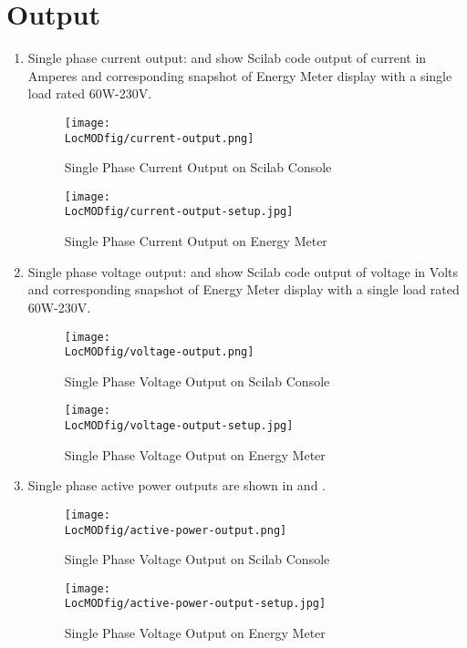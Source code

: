 \section{Output}

\begin{enumerate}
\item Single phase current output:  and
   show Scilab code output of current in
  Amperes and corresponding snapshot of Energy Meter display with a
  single load rated 60W-230V.

\begin{figure}
\centering
\texttt{[image: \\LocMODfig/current-output.png]}
\caption{Single Phase Current Output on Scilab Console}
\label{fig:current-console}
\end{figure}

\begin{figure}
\centering
\texttt{[image: \\LocMODfig/current-output-setup.jpg]}
\caption{Single Phase Current Output on Energy Meter}
\label{fig:current-meter}
\end{figure}

\item Single phase voltage output:  and
   show Scilab code output of voltage in
  Volts and corresponding snapshot of Energy Meter display with a
  single load rated 60W-230V.

\begin{figure}
\centering
\texttt{[image: \\LocMODfig/voltage-output.png]}
\caption{Single Phase Voltage Output on Scilab Console}
\label{fig:voltage-console}
\end{figure}

\begin{figure}
\centering
\texttt{[image: \\LocMODfig/voltage-output-setup.jpg]}
\caption{Single Phase Voltage Output on Energy Meter}
\label{fig:voltage-meter}
\end{figure}

\item Single phase active power outputs are shown in
   and .

\begin{figure}
\centering
\texttt{[image: \\LocMODfig/active-power-output.png]}
\caption{Single Phase Voltage Output on Scilab Console}
\label{fig:power-console}
\end{figure}

\begin{figure}
\centering
\texttt{[image: \\LocMODfig/active-power-output-setup.jpg]}
\caption{Single Phase Voltage Output on Energy Meter}
\label{fig:power-meter}
\end{figure}

\end{enumerate}


